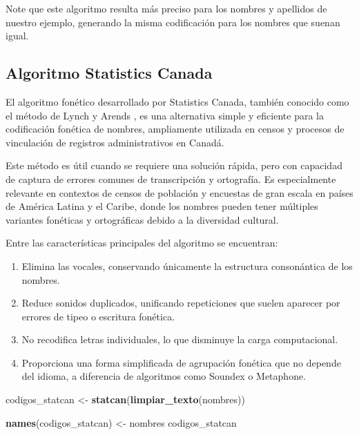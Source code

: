 \documentclass[
  12pt,
]{book}
\newenvironment{Shaded}{\begin{snugshade}}{\end{snugshade}}
\newcommand{\FunctionTok}[1]{\textcolor[rgb]{0.13,0.29,0.53}{\textbf{#1}}}
\newcommand{\NormalTok}[1]{#1}
\newcommand{\OtherTok}[1]{\textcolor[rgb]{0.56,0.35,0.01}{#1}}
\providecommand{\tightlist}{%
  \setlength{\itemsep}{0pt}\setlength{\parskip}{0pt}}
\begin{document}
Note que este algoritmo resulta más preciso para los nombres y apellidos de nuestro ejemplo, generando la misma codificación para los nombres que suenan igual.

\subsection{Algoritmo Statistics Canada}\label{algoritmo-statistics-canada}

El algoritmo fonético desarrollado por Statistics Canada, también conocido como el método de Lynch y Arends \citep{lynch1977selection}, es una alternativa simple y eficiente para la codificación fonética de nombres, ampliamente utilizada en censos y procesos de vinculación de registros administrativos en Canadá.

Este método es útil cuando se requiere una solución rápida, pero con capacidad de captura de errores comunes de transcripción y ortografía. Es especialmente relevante en contextos de censos de población y encuestas de gran escala en países de América Latina y el Caribe, donde los nombres pueden tener múltiples variantes fonéticas y ortográficas debido a la diversidad cultural.

Entre las características principales del algoritmo se encuentran:

\begin{enumerate}
\def\labelenumi{\arabic{enumi}.}
\tightlist
\item
  Elimina las vocales, conservando únicamente la estructura consonántica de los nombres.
\item
  Reduce sonidos duplicados, unificando repeticiones que suelen aparecer por errores de tipeo o escritura fonética.
\item
  No recodifica letras individuales, lo que disminuye la carga computacional.
\item
  Proporciona una forma simplificada de agrupación fonética que no depende del idioma, a diferencia de algoritmos como Soundex o Metaphone.
\end{enumerate}

\begin{Shaded}
\begin{Highlighting}[]
\NormalTok{codigos\_statcan }\OtherTok{\textless{}{-}} \FunctionTok{statcan}\NormalTok{(}\FunctionTok{limpiar\_texto}\NormalTok{(nombres))}

\FunctionTok{names}\NormalTok{(codigos\_statcan) }\OtherTok{\textless{}{-}}\NormalTok{ nombres}
\NormalTok{codigos\_statcan}
\end{Highlighting}
\end{Shaded}
\end{document}

